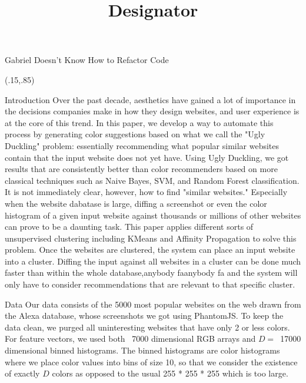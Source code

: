 \documentclass{beamer}
\title[Designator]{Designator}
\begin{document}
\begin{frame}{\centerline{\Huge Gabriel Doesn't Know How to Refactor Code}}
\begin{textblock}{5}(.15,.85)
\begin{block}{Introduction}
Over the past decade, aesthetics have gained a lot of importance in the decisions companies
make in how they design websites, and user experience is at the core of this trend.  In this paper, we develop a way to automate this process by generating color suggestions based on what we call the "Ugly Duckling" problem: essentially recommending what popular similar websites contain that the input website does not yet have. Using Ugly Duckling, we got results that are consistently better than color recommenders based on more classical techniques such as Naive Bayes, SVM, and Random Forest classification. It is not immediately clear, however, how to find "similar websites." Especially when the website dabatase is large, diffing a screenshot or even the color histogram of a given input website against thousands or millions of other websites can prove to be a daunting task. This paper applies different sorts of unsupervised clustering including KMeans and Affinity Propagation to solve this problem. Once the websites are clustered, the system can place
an input website into a cluster. Diffing the input against all websites in a cluster can be
done much faster than within the whole database,anybody faanybody fa and the system will only have to consider
recommendations that are relevant to that specific cluster. 
\end{block}

\begin{block}{Data}
Our data consists of the 5000 most popular websites on the web drawn from the Alexa database, whose screenshots we got using PhantomJS. To keep the data clean, we purged all uninteresting websites that have only 2 or less colors. For feature vectors, we used both ~7000 dimensional RGB arrays and $D=$~17000 dimensional binned histograms. The binned histograms are color histograms where we place color values into bins of size 10, so that we consider the existence of exactly $D$ colors as opposed to the usual 255 * 255 * 255 which is too large.
\end{block}


\end{textblock}
\end{frame}
\end{document}
